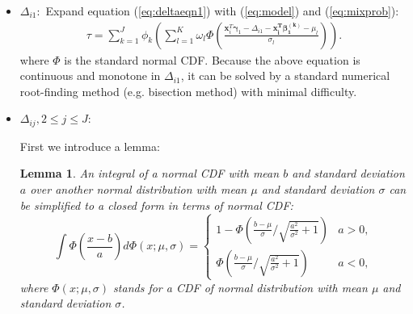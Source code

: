 \documentclass[useAMS,usenatbib,referee]{biom}
\newtheorem{lem}[thm]{Lemma} \newtheorem{pps}[thm]{Proposition}
\begin{document}
\begin{itemize}
\item \textbf{$\Delta_{i1}: $} Expand equation (\ref{eq:deltaeqn1}) with (\ref{eq:model}) and (\ref{eq:mixprob}):
  \begin{align*}
    \tau = \sum_{k = 1}^J \phi_k \left( \sum_{l = 1}^{K} \omega_{l} \Phi \left( \frac{\bm x_{i}^T
        \bm \gamma_1 - \Delta_{i1} -\bm{x_i^T \beta_1^{(k)}} - \mu_{l}}{ \sigma_{l} } \right) \right).
  \end{align*}
  where $\Phi$ is the standard normal CDF. Because the above equation
  is continuous and monotone in $\Delta_{i1}$, it can be solved by a
  standard numerical root-finding method (e.g. bisection method) with
  minimal difficulty.

\item \textbf{$\Delta_{ij}, 2\leq j \leq J: $}

  First we introduce a lemma:
  \begin{lem}\label{ch3:sec:lemma}
    An integral of a normal CDF with mean $b$ and standard deviation
    $a$ over another normal distribution with mean $\mu$ and standard
    deviation $\sigma$ can be simplified to a closed form in terms of
    normal CDF:
    \begin{displaymath}
      \int \Phi \left( \frac{x-b}{a} \right) d\Phi(x; \mu, \sigma)  =
      \begin{cases}
        1- \Phi \left( \frac{b-\mu}{\sigma} \big /
          \sqrt{\frac{a^2}{\sigma^2}+1} \right) & a > 0, \\
        \Phi \left( \frac{b-\mu}{\sigma} \big /
          \sqrt{\frac{a^2}{\sigma^2}+1} \right) & a < 0,
      \end{cases}
    \end{displaymath}
    where $\Phi(x; \mu, \sigma)$ stands for a CDF of normal
    distribution with mean $\mu$ and standard deviation $\sigma$.
  \end{lem}


\end{itemize}
\end{document}
